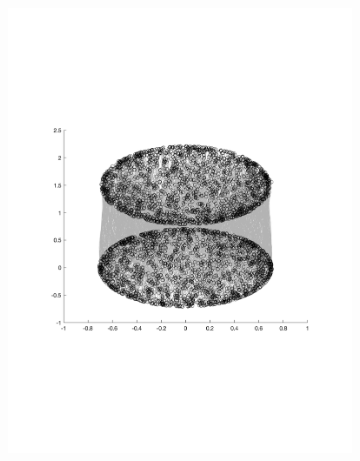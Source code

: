 \begin{figure}
\begin{subfigure}[b]{0.3\textwidth}
        \includegraphics[width=\textwidth]{figures/experiments/FunnelSim1}
        \label{fig:tiger}
    \end{subfigure}
    \\
    \begin{subfigure}[b]{0.3\textwidth}

\end{subfigure}
\end{figure}
